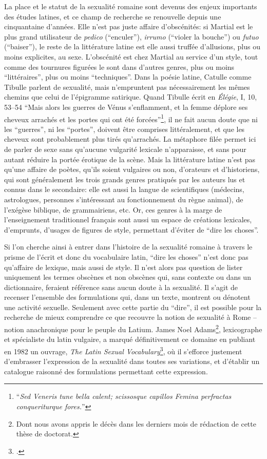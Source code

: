 La place et le statut de la sexualité romaine sont devenus des enjeux importants des études latines, et ce champ de recherche se renouvelle depuis une cinquantaine d'années. Elle n'est pas juste affaire d'obscénités: si Martial est le plus grand utilisateur de \textit{pedico} (\enquote{enculer}), \textit{irrumo} (\enquote{violer la bouche}) ou \textit{futuo} (\enquote{baiser}), le reste de la littérature latine est elle aussi truffée d'allusions, plus ou moins explicites, au sexe. L'obscénité est chez Martial au service d'un style, tout comme des tournures figurées le sont dans d'autres genres, plus ou moins \enquote{littéraires}, plus ou moins \enquote{techniques}. Dans la poésie latine, Catulle comme Tibulle parlent de sexualité, mais n'empruntent pas nécessairement les mêmes chemins que celui de l'épigramme satirique. Quand Tibulle écrit en \textit{Élégie}, I, 10, 53--54 \enquote{Mais alors les guerres de Vénus s'enflamment, et la femme déplore ses cheveux arrachés et les portes qui ont été forcées}\footnote{\enquote{\textit{Sed Veneris tune bella calent; scissosque capillos Femina perfractas conqueriturque fores.}}}, il ne fait aucun doute que ni les \enquote{guerres}, ni les \enquote{portes}, doivent être comprises littéralement, et que les cheveux sont probablement plus tirés qu'arrachés. La métaphore filée permet ici de parler de sexe sans qu'aucune vulgarité lexicale n'apparaisse, et sans pour autant réduire la portée érotique de la scène. Mais la littérature latine n'est pas qu'une affaire de poètes, qu'ils soient vulgaires ou non, d'orateurs et d'historiens, qui sont généralement les trois grands genres pratiqués par les auteurs lus et connus dans le secondaire: elle est aussi la langue de scientifiques (médecins, astrologues, personnes s'intéressant au fonctionnement du règne animal), de l'exégèse biblique, de grammairiens, etc. Or, ces genres à la marge de l'enseignement traditionnel français sont aussi un espace de créations lexicales, d'emprunts, d'usages de figures de style, permettant d'éviter de \enquote{dire les choses}.

Si l'on cherche ainsi à entrer dans l'histoire de la sexualité romaine à travers le prisme de l'écrit et donc du vocabulaire latin, \enquote{dire les choses} n'est donc pas qu'affaire de lexique, mais aussi de style. Il n'est alors pas question de lister uniquement les termes obscènes et non obscènes qui, sans contexte ou dans un dictionnaire, feraient référence sans aucun doute à la sexualité. Il s'agit de recenser l'ensemble des formulations qui, dans un texte, montrent ou dénotent une activité sexuelle. Seulement avec cette partie du \enquote{dire}, il est possible pour la recherche de mieux comprendre ce que recouvre la notion de sexualité à Rome -- notion anachronique pour le peuple du Latium. James Noel Adams\footnote{Dont nous avons appris le décès dans les derniers mois de rédaction de cette thèse de doctorat.}, lexicographe et spécialiste du latin vulgaire, a marqué définitivement ce domaine en publiant en 1982 un ouvrage, \textit{The Latin Sexual Vocabulary}\footcite{adams}, où il s'efforce justement d'embrasser l'expression de la sexualité dans toutes ses variations, et d'établir un catalogue raisonné des formulations permettant cette expression.


